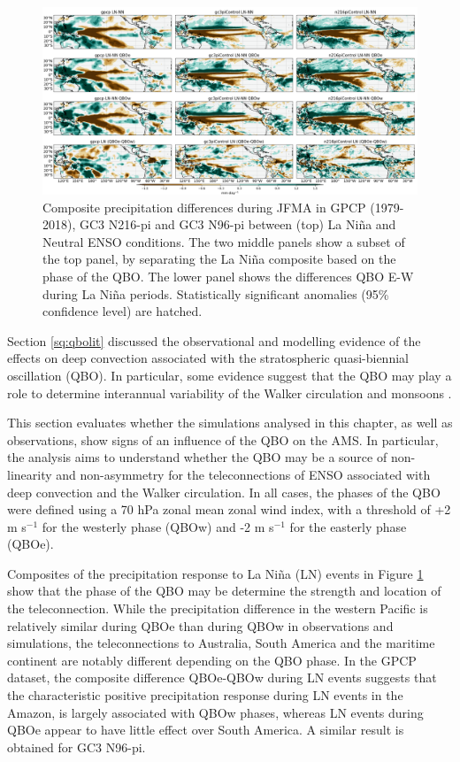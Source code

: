 \begin{figure}[b!]
\includegraphics[width=\linewidth]{figures/trops_qbolnprdjfm}
\caption{Composite precipitation differences during JFMA in GPCP (1979-2018), GC3 N216-pi and GC3 N96-pi between (top) La Niña and Neutral ENSO conditions. The two middle panels show a subset of the top panel, by separating the La Niña composite based on the phase of the QBO. The lower panel shows the differences QBO E-W during La Niña periods. Statistically significant anomalies (95\% confidence level) are hatched.}
\label{fig:qbopr_pis}
\end{figure}  

Section \ref{sq:qbolit} discussed the observational and modelling evidence of the effects on deep convection associated with the stratospheric quasi-biennial oscillation (QBO). In particular, some evidence suggest that the QBO may play a role to determine interannual variability of the Walker circulation and monsoons \citep{giorgetta1999,collimore2003,liess2012}. 

This section evaluates whether the simulations analysed in this chapter, as well as observations, show signs of an influence of the QBO on the AMS. 
In particular, the analysis aims to understand whether the QBO may be a source of non-linearity and non-asymmetry for the teleconnections of ENSO associated with deep convection and the Walker circulation. In all cases, the phases of the QBO were defined using a 70 hPa zonal mean zonal wind index, with a threshold of +2 m s$^{-1}$ for the westerly phase (QBOw) and -2 m s$^{-1}$ for the easterly phase (QBOe).

Composites of the precipitation response to La Niña (LN) events in Figure \ref{fig:qbopr_pis} show that the phase of the QBO may be determine the strength and location of the teleconnection. 
While the precipitation difference in the western Pacific is relatively similar during QBOe than during QBOw in observations and simulations, the teleconnections to Australia, South America and the maritime continent are notably different depending on the QBO phase. 
In the GPCP dataset, the composite difference QBOe-QBOw during LN events suggests that the characteristic positive precipitation response during LN events in the Amazon, is largely associated with QBOw phases, whereas LN events during QBOe appear to have little effect over South America. 
A similar result is obtained for GC3 N96-pi. 


